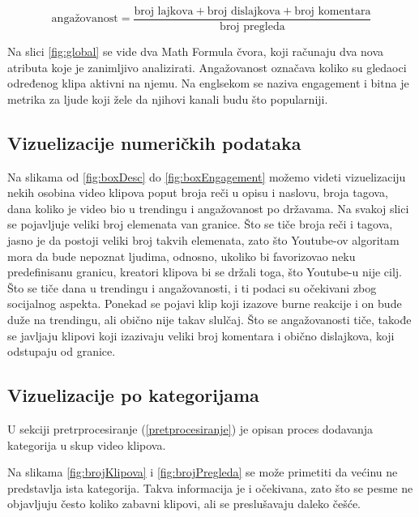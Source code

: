 \documentclass[a4paper]{article}
\theoremstyle{definition}
\begin{document}
$$\text{angažovanost} = \frac{\text{broj lajkova} + \text{broj dislajkova} + \text{broj komentara}}{\text{broj pregleda}}$$

Na slici \ref{fig:global} se vide dva Math Formula čvora, koji računaju dva nova atributa koje je zanimljivo analizirati.
Angažovanost označava koliko su gledaoci određenog klipa aktivni na njemu. Na englsekom se naziva engagement i
bitna je metrika za ljude koji žele da njihovi kanali budu što popularniji.


\subsection{Vizuelizacije numeričkih podataka}

Na slikama od \ref{fig:boxDesc} do \ref{fig:boxEngagement} možemo videti vizuelizaciju nekih osobina video klipova poput broja reči u opisu i naslovu, broja tagova, dana koliko je video bio u trendingu i angažovanost po državama. Na svakoj slici se pojavljuje veliki broj elemenata van granice. Što se tiče broja reči i tagova, jasno je da postoji veliki broj takvih elemenata, zato što Youtube-ov algoritam mora da bude nepoznat ljudima, odnosno, ukoliko bi favorizovao neku predefinisanu granicu, kreatori klipova bi se držali toga, što Youtube-u nije cilj.
\\
Što se tiče dana u trendingu i angažovanosti, i ti podaci su očekivani zbog socijalnog aspekta. Ponekad se pojavi klip koji izazove burne reakcije i on bude duže na trendingu, ali obično nije takav slulčaj. Što se angažovanosti tiče, takođe se javljaju klipovi koji izazivaju veliki broj komentara i obično dislajkova, koji odstupaju od granice.

\subsection{Vizuelizacije po kategorijama}

U sekciji pretrprocesiranje (\ref{pretprocesiranje}) je opisan proces dodavanja kategorija u skup video klipova.

Na slikama \ref{fig:brojKlipova} i \ref{fig:brojPregleda} se može primetiti da većinu ne predstavlja ista kategorija. Takva informacija je i očekivana, zato što se pesme ne objavljuju često koliko zabavni klipovi, ali se preslušavaju daleko češće.

\end{document}
